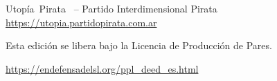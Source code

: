 \newpage
\thispagestyle{empty}

\begin{flushleft}\hbox{\Large{Utopía Pirata}}
\copyleft \, \the\year\space -- Partido Interdimensional Pirata
\url{https://utopia.partidopirata.com.ar}

\vfill

\centering
{}

Esta edición se libera bajo la Licencia de Producción de Pares.

\footnotesize{\url{https://endefensadelsl.org/ppl_deed_es.html}}

\end{flushleft}
\newpage
